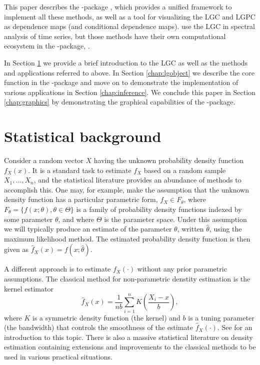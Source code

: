 This paper describes the -package \citep{otne:2019}, which provides a unified framework to implement all these methods, as well as a tool for visualizing the LGC and LGPC as dependence maps (and conditional dependence maps). \citet{jord:tjos:2017} use the LGC in spectral analysis of time series, but those methods have their own computational ecosystem in the -package, \citet{jord:2018}.

In Section \ref{chap:background} we provide a brief introduction to the LGC as well as the methods and applications referred to above. In Section \ref{chap:lgobject} we describe the core function in the -package and move on to demonstrate the implementation of various applications in Section \ref{chap:inference}. We conclude this paper in Section \ref{chap:graphics} by demonstrating the graphical capabilities of the -package.

\section{Statistical background} 
\label{chap:background}

Consider a random vector $X$ having the unknown probability density function $f_X(x)$. It is a standard task to estimate $f_X$ based on a random sample $X_1,\ldots, X_n$, and the statistical literature provides an abundance of methods to accomplish this. One may, for example, make the assumption that the unknown density function has a particular parametric form, $f_X \in F_{\theta}$, where $F_{\theta} = \{f(x;\theta), \theta \in \Theta\}$ is a family of probability density functions indexed by some parameter $\theta$, and where $\Theta$ is the parameter space. Under this assumption we will typically produce an estimate of the parameter $\theta$, written $\widehat \theta$, using the maximum likelihood method. The estimated probability density function is then given as $\widehat f_X(x) = f(x; \widehat\theta)$.

A different approach is to estimate $f_X(\cdot)$ without any prior parametric assumptions. The classical method for non-parametric denstity estimation is the kernel estimator 
$$\widehat f_X(x) = \frac{1}{nb}\sum_{i=1}^n K\left(\frac{X_i - x}{b}\right),$$
where $K$ is a symmetric density function (the kernel) and $b$ is a tuning parameter (the bandwidth) that controls the smoothness of the estimate $\widehat f_X(\cdot)$. See \citet{silv:1986} for an introduction to this topic. There is also a massive statistical literature on density estimation containing extensions and improvements to the classical methods to be used in various practical situations. 

